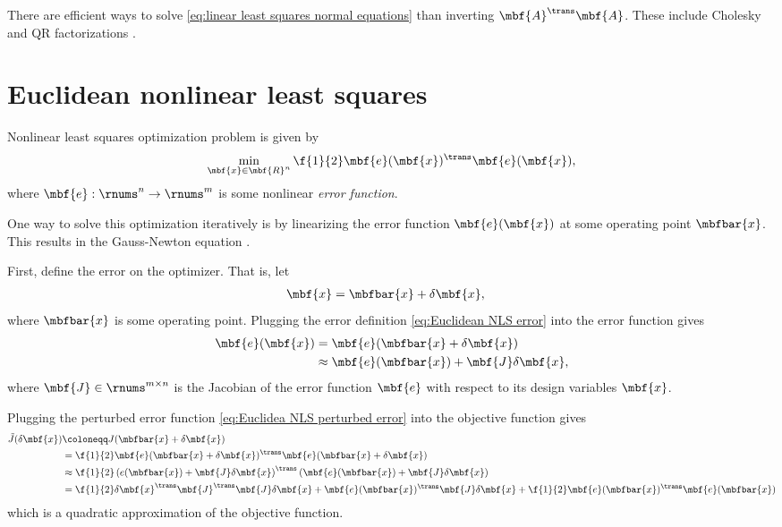 \documentclass[nobib]{tufte-handout}
\begin{document}
    There are efficient ways to solve \eqref{eq:linear least squares normal equations} than inverting $\mbf{A}^{\trans}\mbf{A}$. These include Cholesky and QR factorizations \cite{Golub_Matrix_2013,Dellaert_Factor_2017}.

    \section{Euclidean nonlinear least squares}
    Nonlinear least squares optimization problem is given by
    \begin{align}
        \min_{\mbf{x}\in\mbf{R}^{n}} \f{1}{2}\mbf{e}(\mbf{x})^{\trans}\mbf{e}(\mbf{x}),
    \end{align}
    where $\mbf{e} : \rnums^{n} \to \rnums^{m}$ is some nonlinear \emph{error function}.

    One way to solve this optimization iteratively is by linearizing the error function $\mbf{e}(\mbf{x})$ at some operating point $\mbfbar{x}$. This results in the Gauss-Newton equation \cite{Barfoot_State_2017a,Dellaert_Factor_2017}.

    First, define the error on the optimizer. That is, let
    \begin{align}
        \label{eq:Euclidean NLS error}
        \mbf{x} &= \mbfbar{x} + \delta\mbf{x},
    \end{align}
    where $\mbfbar{x}$ is some operating point. Plugging the error definition \eqref{eq:Euclidean NLS error} into the error function gives
    \begin{align}
        \mbf{e}(\mbf{x}) &= \mbf{e}(\mbfbar{x} +\delta\mbf{x})\\
        \label{eq:Euclidea NLS perturbed error}
        &\approx \mbf{e}(\mbfbar{x}) + \mbf{J}\delta\mbf{x},
    \end{align}
    where $\mbf{J}\in\rnums^{m\times n}$ is the Jacobian of the error function $\mbf{e}$ with respect to its design variables $\mbf{x}$.

    Plugging the perturbed error function \eqref{eq:Euclidea NLS perturbed error} into the objective function gives 
    \begin{align}
        \tilde{J}(\delta\mbf{x}) &\coloneqq J(\mbfbar{x} + \delta\mbf{x})\\
        &= \f{1}{2}\mbf{e}(\mbfbar{x} + \delta\mbf{x})^{\trans}\mbf{e}(\mbfbar{x} + \delta\mbf{x})\\
        &\approx
        \f{1}{2}\left( e(\mbfbar{x}) + \mbf{J}\delta\mbf{x} \right)^{\trans} \left( \mbf{e}(\mbfbar{x}) + \mbf{J}\delta\mbf{x} \right)\\
        &= \f{1}{2}\delta\mbf{x}^{\trans}\mbf{J}^{\trans}\mbf{J}\delta\mbf{x} + \mbf{e}(\mbfbar{x})^{\trans}\mbf{J}\delta\mbf{x} + \f{1}{2}\mbf{e}(\mbfbar{x})^{\trans}\mbf{e}(\mbfbar{x})
    \end{align}
    which is a quadratic approximation of the objective function.
\end{document}
